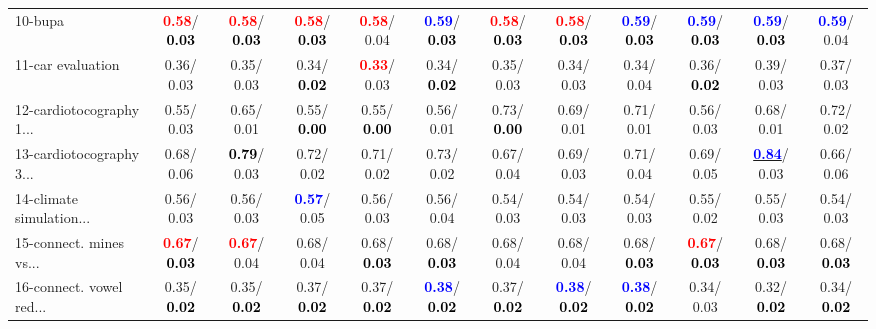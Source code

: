 \begin{table}[h]
\begin{center}
{\begin{tabular}{lc|c|c|c|c|c|c|c|c|c|c}
10-bupa & \textcolor{red}{\textbf{  0.58}}/\textcolor{black}{\textbf{  0.03}} & \textcolor{red}{\textbf{  0.58}}/\textcolor{black}{\textbf{  0.03}} & \textcolor{red}{\textbf{  0.58}}/\textcolor{black}{\textbf{  0.03}} & \textcolor{red}{\textbf{  0.58}}/  0.04 & \textcolor{blue}{\textbf{  0.59}}/\textcolor{black}{\textbf{  0.03}} & \textcolor{red}{\textbf{  0.58}}/\textcolor{black}{\textbf{  0.03}} & \textcolor{red}{\textbf{  0.58}}/\textcolor{black}{\textbf{  0.03}} & \textcolor{blue}{\textbf{  0.59}}/\textcolor{black}{\textbf{  0.03}} & \textcolor{blue}{\textbf{  0.59}}/\textcolor{black}{\textbf{  0.03}} & \textcolor{blue}{\textbf{  0.59}}/\textcolor{black}{\textbf{  0.03}} & \textcolor{blue}{\textbf{  0.59}}/  0.04 \\
11-car evaluation &   0.36/  0.03 &   0.35/  0.03 &   0.34/\textcolor{black}{\textbf{  0.02}} & \textcolor{red}{\textbf{  0.33}}/  0.03 &   0.34/\textcolor{black}{\textbf{  0.02}} &   0.35/  0.03 &   0.34/  0.03 &   0.34/  0.04 &   0.36/\textcolor{black}{\textbf{  0.02}} &   0.39/  0.03 &   0.37/  0.03 \\
12-cardiotocography 1... &   0.55/  0.03 &   0.65/  0.01 &   0.55/\textcolor{black}{\textbf{  0.00}} &   0.55/\textcolor{black}{\textbf{  0.00}} &   0.56/  0.01 &   0.73/\textcolor{black}{\textbf{  0.00}} &   0.69/  0.01 &   0.71/  0.01 &   0.56/  0.03 &   0.68/  0.01 &   0.72/  0.02 \\
13-cardiotocography 3... &   0.68/  0.06 & \textcolor{black}{\textbf{  0.79}}/  0.03 &   0.72/  0.02 &   0.71/  0.02 &   0.73/  0.02 &   0.67/  0.04 &   0.69/  0.03 &   0.71/  0.04 &   0.69/  0.05 & \underline{\textcolor{blue}{\textbf{  0.84}}}/  0.03 &   0.66/  0.06 \\
14-climate simulation... &   0.56/  0.03 &   0.56/  0.03 & \textcolor{blue}{\textbf{  0.57}}/  0.05 &   0.56/  0.03 &   0.56/  0.04 &   0.54/  0.03 &   0.54/  0.03 &   0.54/  0.03 &   0.55/  0.02 &   0.55/  0.03 &   0.54/  0.03 \\ \hline
15-connect. mines vs... & \textcolor{red}{\textbf{  0.67}}/\textcolor{black}{\textbf{  0.03}} & \textcolor{red}{\textbf{  0.67}}/  0.04 &   0.68/  0.04 &   0.68/\textcolor{black}{\textbf{  0.03}} &   0.68/\textcolor{black}{\textbf{  0.03}} &   0.68/  0.04 &   0.68/  0.04 &   0.68/\textcolor{black}{\textbf{  0.03}} & \textcolor{red}{\textbf{  0.67}}/\textcolor{black}{\textbf{  0.03}} &   0.68/\textcolor{black}{\textbf{  0.03}} &   0.68/\textcolor{black}{\textbf{  0.03}} \\
16-connect. vowel red... &   0.35/\textcolor{black}{\textbf{  0.02}} &   0.35/\textcolor{black}{\textbf{  0.02}} &   0.37/\textcolor{black}{\textbf{  0.02}} &   0.37/\textcolor{black}{\textbf{  0.02}} & \textcolor{blue}{\textbf{  0.38}}/\textcolor{black}{\textbf{  0.02}} &   0.37/\textcolor{black}{\textbf{  0.02}} & \textcolor{blue}{\textbf{  0.38}}/\textcolor{black}{\textbf{  0.02}} & \textcolor{blue}{\textbf{  0.38}}/\textcolor{black}{\textbf{  0.02}} &   0.34/  0.03 &   0.32/\textcolor{black}{\textbf{  0.02}} &   0.34/\textcolor{black}{\textbf{  0.02}} \\

\end{tabular}}
\end{center}
\end{table}
